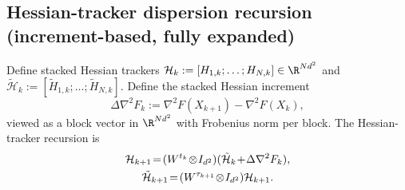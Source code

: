 \documentclass[review,onefignum,onetabnum]{siamart171218}
\begin{document}
\subsection{Hessian-tracker dispersion recursion (increment-based, fully expanded)}

Define stacked Hessian trackers $\mathcal H_k:=[H_{1,k};\dots;H_{N,k}]\in\R^{Nd^2}$ and
$\tilde{\mathcal H}_k:=[\tilde H_{1,k};\dots;\tilde H_{N,k}]$.
Define the stacked Hessian increment
\[
\Delta\nabla^2 F_k:=\nabla^2 F(X_{k+1})-\nabla^2 F(X_k),
\]
viewed as a block vector in $\R^{Nd^2}$ with Frobenius norm per block.
The Hessian-tracker recursion is
\begin{gather}
\mathcal H_{k+1}\!=\!(W^{t_k}\!\otimes\! I_{d^2})(\tilde{\mathcal H}_k\!+\!\Delta\nabla^2 F_k),\label{eq:H_update_stack}\\
\tilde{\mathcal H}_{k+1}\!=\!(W^{\tau_{k+1}}\!\otimes\! I_{d^2})\mathcal H_{k+1}.\notag
\end{gather}
\end{document}
